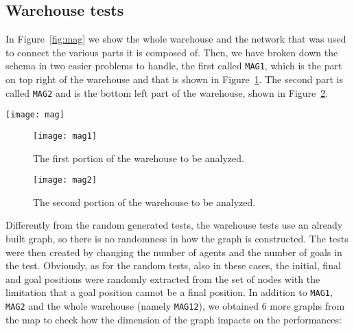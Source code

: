 \subsection{Warehouse tests}
In Figure~\ref{fig:mag} we show the whole warehouse and the network that was
used to connect the various parts it is composed of. \newline
Then, we have broken down the schema in two easier problems to handle, the
first called \texttt{MAG1}, which is the part on top right of the warehouse and
that is shown in Figure~\ref{fig:mag1}. The second part is called \texttt{MAG2}
and is the bottom left part of the warehouse, shown in Figure~\ref{fig:mag2}.
\begin{sidewaysfigure}[ht]
  \centering
  \texttt{[image: mag]}
  \caption{The schema for the whole warehouse with the superimposed road
    network used in the tests. \texttt{MAG1} is the portion squared in blue,
  while \texttt{MAG2} is the one squared in yellow.}
  \label{fig:mag}
\end{sidewaysfigure}
\begin{figure}[tb]
  \centering
  \texttt{[image: mag1]}
  \caption{The first portion of the warehouse to be analyzed.}
  \label{fig:mag1}
\end{figure}
\begin{figure}[tb]
  \centering
  \texttt{[image: mag2]}
  \caption{The second portion of the warehouse to be analyzed.}
  \label{fig:mag2}
\end{figure}
Differently from the random generated tests, the warehouse tests use an already
built graph, so there is no randomness in how the graph is constructed. The 
tests were then created by changing the number of agents and the number of
goals in the test. Obviously, as for the random tests, also in these cases, 
the initial, final and goal positions were randomly extracted from the set of
nodes with the limitation that a goal position cannot be a final position.
\newline
In addition to \texttt{MAG1}, \texttt{MAG2} and the whole warehouse (namely
\texttt{MAG12}), we obtained 6 more graphs from the map to check how the
dimension of the graph impacts on the performances:

